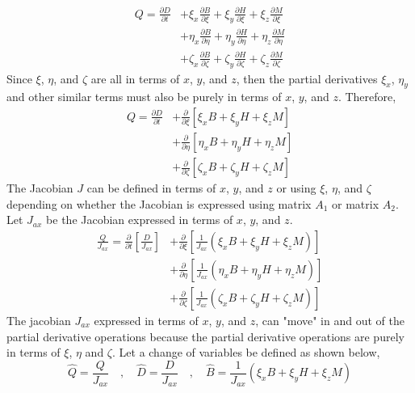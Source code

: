 \documentclass[a4paper, 12pt]{report}
\begin{document}
\begin{center}
\begin{align*}
Q = \frac{\partial D}{\partial t} & + \xi_{x}\frac{\partial B}{\partial \xi} + \xi_{y}\frac{\partial H}{\partial \xi} + \xi_{z}\frac{\partial M}{\partial\xi}
\\ & + \eta_{x}\frac{\partial B}{\partial \eta} + \eta_{y}\frac{\partial H}{\partial \eta} + \eta_{z}\frac{\partial M}{\partial\eta}
\\ & + \zeta_{x}\frac{\partial B}{\partial \zeta} + \zeta_{y}\frac{\partial H}{\partial \zeta} + \zeta_{z}\frac{\partial M}{\partial\zeta}
\end{align*}
Since $\xi$, $\eta$, and $\zeta$ are all in terms of $x$, $y$, and $z$, then the partial derivatives $\xi_{x}$, $\eta_{y}$ and other similar terms must also be purely in terms of $x$, $y$, and $z$. Therefore,
\begin{align*}
Q = \frac{\partial D}{\partial t} & + \frac{\partial}{\partial \xi}\left[\xi_{x}B + \xi_{y}H + \xi_{z}M\right]
\\ & + \frac{\partial}{\partial \eta}\left[\eta_{x}B + \eta_{y}H + \eta_{z}M\right]
\\ & + \frac{\partial}{\partial \zeta}\left[\zeta_{x}B + \zeta_{y}H + \zeta_{z}M\right]
\end{align*}
The Jacobian $J$ can be defined in terms of $x$, $y$, and $z$ or using $\xi$, $\eta$, and $\zeta$ depending on whether the Jacobian is expressed using matrix $A_{1}$ or matrix $A_{2}$. Let  $J_{ax}$ be the Jacobian expressed in terms of $x$, $y$, and $z$.
\begin{align*}
\frac{Q}{J_{ax}} = \frac{\partial }{\partial t}\left[\frac{D}{J_{ax}}\right] & + \frac{\partial}{\partial \xi}\left[\frac{1}{J_{ax}}\left(\xi_{x}B + \xi_{y}H + \xi_{z}M\right)\right]
\\ & + \frac{\partial}{\partial \eta}\left[\frac{1}{J_{ax}}\left(\eta_{x}B + \eta_{y}H + \eta_{z}M\right)\right]
\\ & + \frac{\partial}{\partial \zeta}\left[\frac{1}{J_{ax}}\left(\zeta_{x}B + \zeta_{y}H + \zeta_{z}M\right)\right]
\end{align*}
The jacobian $J_{ax}$ expressed in terms of $x$, $y$, and $z$, can "move" in and out of the partial derivative operations because the partial derivative operations are purely in terms of $\xi$, $\eta$ and $\zeta$.  Let a change of variables be defined as shown below,
\begin{equation}
\hat{Q} = \frac{Q}{J_{ax}} \quad,\quad \hat{D} = \frac{D}{J_{ax}} \quad,\quad \hat{B} = \frac{1}{J_{ax}}\left(\xi_{x}B + \xi_{y}H + \xi_{z}M\right) 
\label{QDBHM transformation def 1}

\end{equation}
\end{center}
\end{document}
